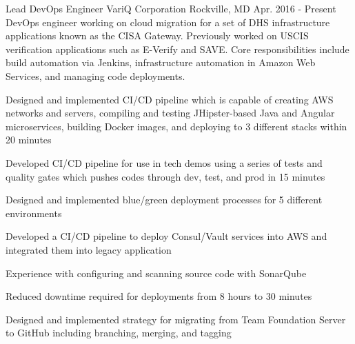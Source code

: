 

\begin{cventries}

  \cventry
    {Lead DevOps Engineer} %
    {VariQ Corporation} %
    {Rockville, MD} %
    {Apr. 2016 - Present} %
    {DevOps engineer working on cloud migration for a set of DHS infrastructure applications known as the CISA Gateway. Previously worked on USCIS verification applications such as E-Verify and SAVE. Core responsibilities include build automation via Jenkins, infrastructure automation in Amazon Web Services, and managing code deployments.} %
    {
      \begin{cvitems} %
        \item {Designed and implemented CI/CD pipeline which is capable of creating AWS networks and servers, compiling and testing JHipster-based Java and Angular microservices, building Docker images, and deploying to 3 different stacks within 20 minutes}
        \item {Developed CI/CD pipeline for use in tech demos using a series of tests and quality gates which pushes codes through dev, test, and prod in 15 minutes}
        \item {Designed and implemented blue/green deployment processes for 5 different environments}
        \item {Developed a CI/CD pipeline to deploy Consul/Vault services into AWS and integrated them into legacy application}
        \item {Experience with configuring and scanning source code with SonarQube}
        \item {Reduced downtime required for deployments from 8 hours to 30 minutes}
        \item {Designed and implemented strategy for migrating from Team Foundation Server to GitHub including branching, merging, and tagging}

\end{cvitems}}
\end{cventries}
